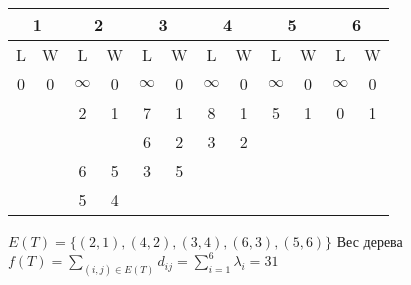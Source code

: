 \documentclass[12pt]{article}
\begin{document}
\begin{tabular}{@{}|c|c|c|c|c|c|c|c|c|c|c|c|@{}}
\toprule
\multicolumn{2}{|c|}{1}                 & \multicolumn{2}{c|}{2}                 & \multicolumn{2}{c|}{3} & \multicolumn{2}{c|}{4} & \multicolumn{2}{c|}{5}                 & \multicolumn{2}{c|}{6}                 \\ \midrule
L                  & W                  & L                  & W                 & L          & W         & L          & W         & L                  & W                 & L                  & W                 \\ \midrule
0                  & 0                  & $\infty$                 & 0                 & $\infty$         & 0         & $\infty$         & 0         & $\infty$                 & 0                 & $\infty$                 & 0                 \\ \midrule
\multicolumn{2}{|c|}{\multirow{4}{*}{}} & 2                  & 1                 & 7          & 1         & 8          & 1         & 5                  & 1                 & 0                  & 1                 \\ \cmidrule(l){3-12} 
\multicolumn{2}{|c|}{}                  & \multicolumn{2}{c|}{\multirow{3}{*}{}} & \multicolumn{2}{c|}{}  & 6          & 2         & 3                  & 2                 & \multicolumn{2}{c|}{\multirow{3}{*}{}} \\ \cmidrule(lr){5-10}
\multicolumn{2}{|c|}{}                  & \multicolumn{2}{c|}{}                  & 6          & 5         & 3          & 5         & \multicolumn{2}{c|}{\multirow{2}{*}{}} & \multicolumn{2}{c|}{}                  \\ \cmidrule(lr){5-8}
\multicolumn{2}{|c|}{}                  & \multicolumn{2}{c|}{}                  & 5          & 4         & \multicolumn{2}{c|}{}  & \multicolumn{2}{c|}{}                  & \multicolumn{2}{c|}{}                  \\ \bottomrule
\end{tabular}

	$E(T) = \{(2, 1), (4, 2), (3, 4), (6, 3), (5, 6)\}$
	Вес дерева 
	$f(T) = \sum\limits_{(i, j) \in E(T)} d_{ij} = \sum\limits_{i = 1}^6 \lambda_{i} = 31$ \\ \\
	
\end{document}
